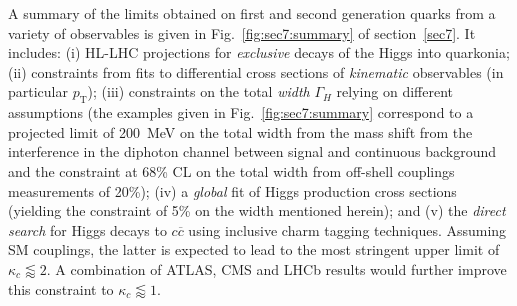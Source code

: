 \documentclass[../report.tex]{subfiles}
\begin{document}
A summary of the limits obtained on  first and second generation quarks from a variety of observables is given in Fig.~\ref{fig:sec7:summary} of section~\ref{sec7}. It includes: (i) HL-LHC projections for {\it exclusive} decays of the Higgs into quarkonia; (ii) constraints from fits to differential cross sections of {\it kinematic} observables (in particular $p_\mathrm{T}$); (iii) constraints on the total {\it width} $\Gamma_H$ relying on different assumptions (the examples given in  Fig.~\ref{fig:sec7:summary} correspond to a projected limit of 200~MeV on the total width from the mass shift from the interference in the diphoton channel between signal and continuous background and the constraint at 68\% CL on the total width from off-shell couplings measurements of 20\%); (iv) a {\it global} fit of Higgs production cross sections (yielding the constraint of 5\% on the width mentioned herein); and (v) the {\it direct search} for Higgs decays to $c\overline{c}$ using inclusive charm tagging techniques. Assuming SM couplings, the latter is expected to lead to the most stringent upper limit of $\kappa_c \lessapprox 2$. A combination of ATLAS, CMS and LHCb results would further improve this constraint to $\kappa_c \lessapprox 1$.


\end{document}
